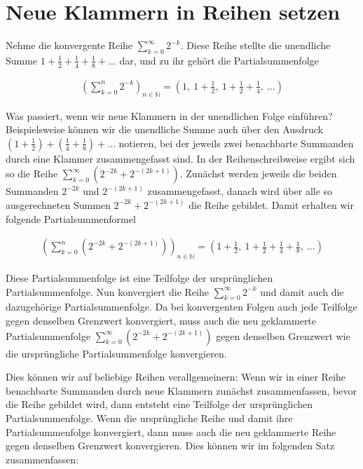 \documentclass[fontsize=9pt,
               parskip=half-,
               DIV=14,
               listof=chapterentry,
               tocflat]{scrbook}
\begin{document}
\section{Neue Klammern in Reihen setzen}

Nehme die konvergente Reihe $\sum _{k=0}^{\infty }2^{-k}$. Diese Reihe stellte die unendliche Summe $1+{\tfrac {1}{2}}+{\tfrac {1}{4}}+{\tfrac {1}{8}}+\ldots $ dar, und zu ihr gehört die Partialsummenfolge

\begin{align*}
\left(\sum _{k=0}^{n}2^{-k}\right)_{n\in \mathbb {N} }=\left(1,\ 1+{\frac {1}{2}},\ 1+{\frac {1}{2}}+{\frac {1}{4}},\ \ldots \right)
\end{align*}

Was passiert, wenn wir neue Klammern in der unendlichen Folge einführen? Beispielsweise können wir die unendliche Summe auch über den Ausdruck $\left(1+{\tfrac {1}{2}}\right)+\left({\tfrac {1}{4}}+{\tfrac {1}{8}}\right)+\ldots $ notieren, bei der jeweils zwei benachbarte Summanden durch eine Klammer zusammengefasst sind. In der Reihenschreibweise ergibt sich so die Reihe $\sum _{k=0}^{\infty }\left(2^{-2k}+2^{-(2k+1)}\right)$. Zunächst werden jeweils die beiden Summanden $2^{-2k}$ und $2^{-(2k+1)}$ zusammengefasst, danach wird über alle so ausgerechneten Summen $2^{-2k}+2^{-(2k+1)}$ die Reihe gebildet. Damit erhalten wir folgende Partialsummenformel

\begin{align*}
\left(\sum _{k=0}^{n}\left(2^{-2k}+2^{-(2k+1)}\right)\right)_{n\in \mathbb {N} }=\left(1+{\frac {1}{2}},\ 1+{\frac {1}{2}}+{\frac {1}{4}}+{\frac {1}{8}},\ \ldots \right)
\end{align*}

Diese Partialsummenfolge ist eine Teilfolge der ursprünglichen Partialsummenfolge. Nun konvergiert die Reihe $\sum _{k=0}^{\infty }2^{-k}$ und damit auch die dazugehörige Partialsummenfolge. Da bei konvergenten Folgen auch jede Teilfolge gegen denselben Grenzwert konvergiert, muss auch die neu geklammerte Partialsummenfolge $\sum _{k=0}^{\infty }\left(2^{-2k}+2^{-(2k+1)}\right)$ gegen denselben Grenzwert wie die ursprüngliche Partialsummenfolge konvergieren.

Dies können wir auf beliebige Reihen verallgemeinern: Wenn wir in einer Reihe benachbarte Summanden durch neue Klammern zunächst zusammenfassen, bevor die Reihe gebildet wird, dann entsteht eine Teilfolge der ursprünglichen Partialsummenfolge. Wenn die ursprüngliche Reihe und damit ihre Partialsummenfolge konvergiert, dann muss auch die neu geklammerte Reihe gegen denselben Grenzwert konvergieren. Dies können wir im folgenden Satz zusammenfassen:
\end{document}
